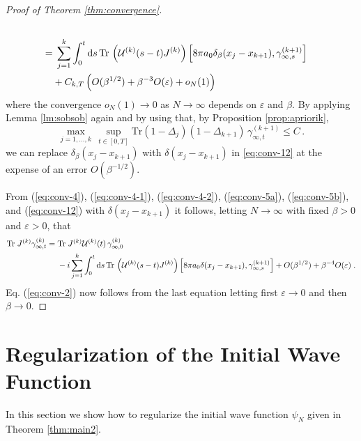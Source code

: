 \documentclass[11pt]{article}
\newcommand{\rd}{{\rm d}}
\newcommand{\eps}{\varepsilon}
\newcommand{\e}{\varepsilon}
\newcommand{\cU}{{\cal U}}
\newcommand{\tr}{\mbox{Tr}}
\begin{document}
\begin{proof}[Proof of Theorem \ref{thm:convergence}]
\begin{equation}
\begin{split}
 \\
= &\; \sum_{j=1}^k \int_0^t \rd s \, \tr \, \left(\cU^{(k)} (s-t)
J^{(k)}\right) \left[ 8\pi a_0 \delta_{\beta} (x_j -x_{k+1}),
 \gamma_{\infty,s}^{(k+1)} \right]\\
&+C_{k,T} \left(O(\beta^{1/2}) + \beta^{-3} O(\e) + o_N (1) \right)
\end{split}
\end{equation}
where the convergence $o_N (1) \to 0$ as $N \to \infty$ depends on
$\eps$ and $\beta$. By applying
 Lemma \ref{lm:sobsob} again and by using that,
 by
Proposition \ref{prop:apriorik}, \[ \max_{j=1,\dots, k} \, \sup_{t
\in [0,T]} \tr (1-\Delta_j) (1-\Delta_{k+1}) \,
\gamma_{\infty,t}^{(k+1)} \leq C \,.\]
we can replace $\delta_\beta(x_j-x_{k+1})$ with $\delta(x_j-x_{k+1})$
in \eqref{eq:conv-12}
at the expense of an error $O(\beta^{-1/2})$.


\medskip

{F}rom (\ref{eq:conv-4}), (\ref{eq:conv-4-1}), (\ref{eq:conv-4-2}),
(\ref{eq:conv-5a}), (\ref{eq:conv-5b}), and (\ref{eq:conv-12})
with $\delta(x_j-x_{k+1})$ it
follows, letting $N \to \infty$ with fixed $\beta >0$ and $\e > 0$,
that
\begin{equation}
\begin{split}
\tr \; J^{(k)}  \gamma^{(k)}_{\infty,t}
= \; &\tr \; J^{(k)} \cU^{(k)} (t) \,  \gamma_{\infty,0}^{(k)} \\
&-i \sum_{j=1}^k \int_0^t \rd s \, \tr \, \left(\cU^{(k)} (s-t)
J^{(k)}\right) \left[ 8\pi a_0 \delta (x_j -x_{k+1}),
\gamma_{\infty,s}^{(k+1)} \right] + O(\beta^{1/2})+ \beta^{-4} O(\e)\; .
\nonumber
\end{split}
\end{equation}
Eq. (\ref{eq:conv-2}) now
follows from the last equation letting first $\e \to 0$ and then
$\beta\to 0$.
\end{proof}



\section{Regularization of the Initial Wave Function}
\setcounter{equation}{0}

In this section we show how to regularize the initial wave function
$\psi_N$  given in Theorem \ref{thm:main2}.
\end{document}
